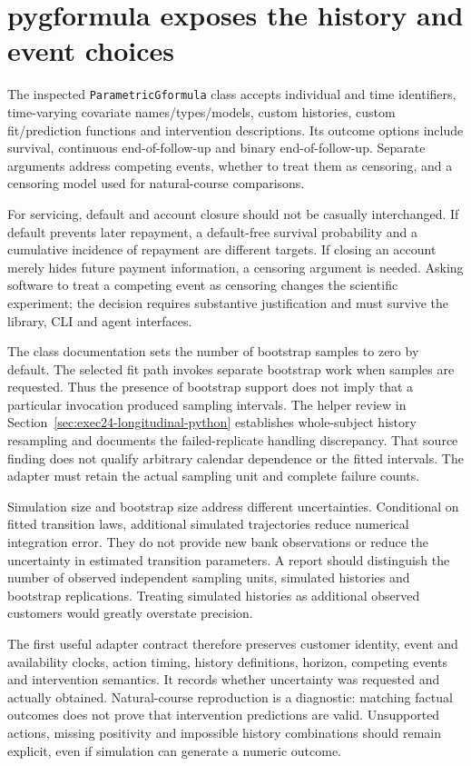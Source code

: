 \section{pygformula exposes the history and event choices}

The inspected \texttt{ParametricGformula} class accepts individual and time
identifiers, time-varying covariate names/types/models, custom histories, custom
fit/prediction functions and intervention descriptions. Its outcome options
include survival, continuous end-of-follow-up and binary end-of-follow-up.
Separate arguments address competing events, whether to treat them as censoring,
and a censoring model used for natural-course comparisons. \citep{v13_sw_pygformula}

For servicing, default and account closure should not be casually interchanged.
If default prevents later repayment, a default-free survival probability and a
cumulative incidence of repayment are different targets. If closing an account
merely hides future payment information, a censoring argument is needed. Asking
software to treat a competing event as censoring changes the scientific
experiment; the decision requires substantive justification and must survive
the library, CLI and agent interfaces.

The class documentation sets the number of bootstrap samples to zero by
default. The selected fit path invokes separate bootstrap work when samples
are requested. Thus the presence of bootstrap support does not imply that a
particular invocation produced sampling intervals. The helper review in
Section~\ref{sec:exec24-longitudinal-python} establishes whole-subject history
resampling and documents the failed-replicate handling discrepancy. That source
finding does not qualify arbitrary calendar dependence or the fitted intervals.
The adapter must retain the actual sampling unit and complete failure counts.
\citep{v13_sw_pygformula}

Simulation size and bootstrap size address different uncertainties. Conditional
on fitted transition laws, additional simulated trajectories reduce numerical
integration error. They do not provide new bank observations or reduce the
uncertainty in estimated transition parameters. A report should distinguish
the number of observed independent sampling units, simulated histories and
bootstrap replications. Treating simulated histories as additional observed
customers would greatly overstate precision.

The first useful adapter contract therefore preserves customer identity, event
and availability clocks, action timing, history definitions, horizon, competing
events and intervention semantics. It records whether uncertainty was requested
and actually obtained. Natural-course reproduction is a diagnostic: matching
factual outcomes does not prove that intervention predictions are valid.
Unsupported actions, missing positivity and impossible history combinations
should remain explicit, even if simulation can generate a numeric outcome.


